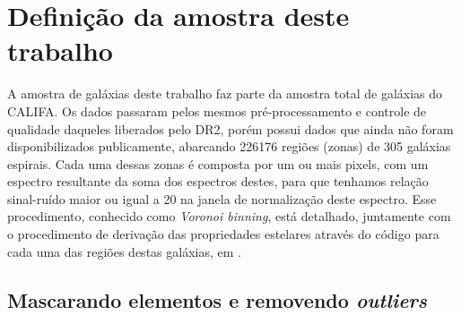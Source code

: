 \section{Definição da amostra deste trabalho}
\label{sec:amostra:definicao}

A amostra de galáxias deste trabalho faz parte da amostra total de galáxias do CALIFA. Os dados
passaram pelos mesmos pré-processamento e controle de qualidade daqueles liberados pelo DR2, porém
possui dados que ainda não foram disponibilizados publicamente, abarcando 226176 regiões (zonas) de
305 galáxias espirais. Cada uma dessas zonas é composta por um ou mais pixels, com um espectro
resultante da soma dos espectros destes, para que tenhamos relação sinal-ruído maior ou igual a 20
na janela de normalização deste espectro. Esse procedimento, conhecido como {\em Voronoi binning},
está detalhado, juntamente com o procedimento de derivação das propriedades estelares através do
código \starlight para cada uma das regiões destas galáxias, em \citet{CidFernandes.etal.2013a}.

\subsection{Mascarando elementos e removendo {\em outliers}}
\label{sec:amostra:mask}

